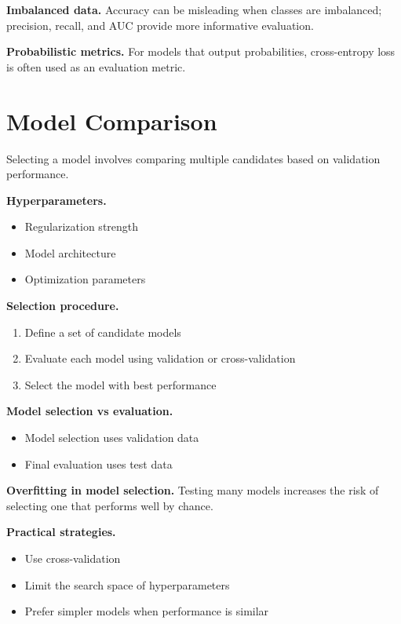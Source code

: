 \medskip

\noindent
\textbf{Imbalanced data.}  
Accuracy can be misleading when classes are imbalanced; precision, recall, and AUC provide more informative evaluation.

\medskip

\noindent
\textbf{Probabilistic metrics.}  
For models that output probabilities, cross-entropy loss is often used as an evaluation metric.

\section{Model Comparison}

Selecting a model involves comparing multiple candidates based on validation performance.

\medskip

\noindent
\textbf{Hyperparameters.}
\begin{itemize}
    \item Regularization strength
    \item Model architecture
    \item Optimization parameters
\end{itemize}

\medskip

\noindent
\textbf{Selection procedure.}
\begin{enumerate}
    \item Define a set of candidate models
    \item Evaluate each model using validation or cross-validation
    \item Select the model with best performance
\end{enumerate}

\medskip

\noindent
\textbf{Model selection vs evaluation.}
\begin{itemize}
    \item Model selection uses validation data
    \item Final evaluation uses test data
\end{itemize}

\medskip

\noindent
\textbf{Overfitting in model selection.}  
Testing many models increases the risk of selecting one that performs well by chance.

\medskip

\noindent
\textbf{Practical strategies.}
\begin{itemize}
    \item Use cross-validation
    \item Limit the search space of hyperparameters
    \item Prefer simpler models when performance is similar
\end{itemize}

